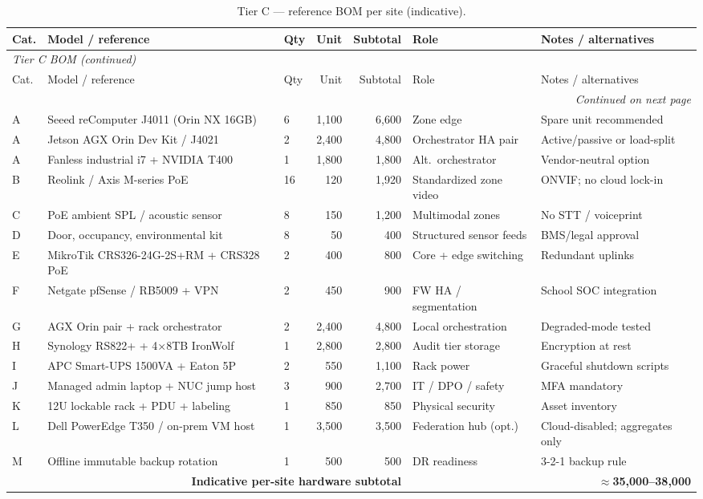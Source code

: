 \begin{longtable}{@{}p{0.7cm}p{2.4cm}p{2.6cm}r r p{2.2cm}p{2.5cm}@{}}
  \caption{Tier C --- reference BOM per site (indicative).}
  \label{tab:bom-tier-c} \\
  \toprule
  Cat. & Model / reference & Qty & Unit & Subtotal & Role & Notes / alternatives \\
  \midrule
  \endfirsthead
  \multicolumn{7}{l}{\textit{Tier C BOM (continued)}} \\
  \toprule
  Cat. & Model / reference & Qty & Unit & Subtotal & Role & Notes / alternatives \\
  \midrule
  \endhead
  \midrule
  \multicolumn{7}{r}{\textit{Continued on next page}} \\
  \endfoot
  \bottomrule
  \endlastfoot
  A & Seeed reComputer J4011 (Orin NX 16GB) & 6 & 1{,}100 & 6{,}600 &
    Zone edge & Spare unit recommended \\
  A & Jetson AGX Orin Dev Kit / J4021 & 2 & 2{,}400 & 4{,}800 &
    Orchestrator HA pair & Active/passive or load-split \\
  A & Fanless industrial i7 + NVIDIA T400 & 1 & 1{,}800 & 1{,}800 &
    Alt.\ orchestrator & Vendor-neutral option \\
  B & Reolink / Axis M-series PoE & 16 & 120 & 1{,}920 &
    Standardized zone video & ONVIF; no cloud lock-in \\
  C & PoE ambient SPL / acoustic sensor & 8 & 150 & 1{,}200 &
    Multimodal zones & No STT / voiceprint \\
  D & Door, occupancy, environmental kit & 8 & 50 & 400 &
    Structured sensor feeds & BMS/legal approval \\
  E & MikroTik CRS326-24G-2S+RM + CRS328 PoE & 2 & 400 & 800 &
    Core + edge switching & Redundant uplinks \\
  F & Netgate pfSense / RB5009 + VPN & 2 & 450 & 900 &
    FW HA / segmentation & School SOC integration \\
  G & AGX Orin pair + rack orchestrator & 2 & 2{,}400 & 4{,}800 &
    Local orchestration & Degraded-mode tested \\
  H & Synology RS822+ + 4×8TB IronWolf & 1 & 2{,}800 & 2{,}800 &
    Audit tier storage & Encryption at rest \\
  I & APC Smart-UPS 1500VA + Eaton 5P & 2 & 550 & 1{,}100 &
    Rack power & Graceful shutdown scripts \\
  J & Managed admin laptop + NUC jump host & 3 & 900 & 2{,}700 &
    IT / DPO / safety & MFA mandatory \\
  K & 12U lockable rack + PDU + labeling & 1 & 850 & 850 &
    Physical security & Asset inventory \\
  L & Dell PowerEdge T350 / on-prem VM host & 1 & 3{,}500 & 3{,}500 &
    Federation hub (opt.) & Cloud-disabled; aggregates only \\
  M & Offline immutable backup rotation & 1 & 500 & 500 &
    DR readiness & 3-2-1 backup rule \\
  \midrule
  \multicolumn{5}{r}{\textbf{Indicative per-site hardware subtotal}} &
    \multicolumn{2}{r}{\textbf{$\approx$35{,}000--38{,}000}} \\
\end{longtable}

